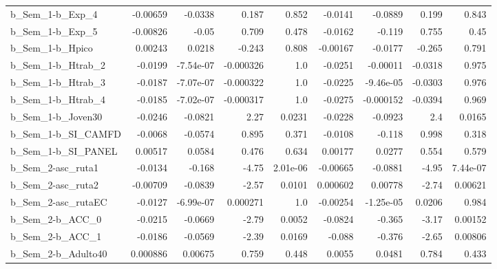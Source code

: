 \begin{tabular}{lrrrrrrrr}
b\_Sem\_1-b\_Exp\_4            &    -0.00659 &      -0.0338 &     0.187 &    0.852 &    -0.0141 &     -0.0889 &        0.199 &         0.843 \\
b\_Sem\_1-b\_Exp\_5            &    -0.00826 &        -0.05 &     0.709 &    0.478 &    -0.0162 &      -0.119 &        0.755 &          0.45 \\
b\_Sem\_1-b\_Hpico            &     0.00243 &       0.0218 &    -0.243 &    0.808 &   -0.00167 &     -0.0177 &       -0.265 &         0.791 \\
b\_Sem\_1-b\_Htrab\_2          &     -0.0199 &    -7.54e-07 & -0.000326 &      1.0 &    -0.0251 &    -0.00011 &      -0.0318 &         0.975 \\
b\_Sem\_1-b\_Htrab\_3          &     -0.0187 &    -7.07e-07 & -0.000322 &      1.0 &    -0.0225 &   -9.46e-05 &      -0.0303 &         0.976 \\
b\_Sem\_1-b\_Htrab\_4          &     -0.0185 &    -7.02e-07 & -0.000317 &      1.0 &    -0.0275 &   -0.000152 &      -0.0394 &         0.969 \\
b\_Sem\_1-b\_Joven30          &     -0.0246 &      -0.0821 &      2.27 &   0.0231 &    -0.0228 &     -0.0923 &          2.4 &        0.0165 \\
b\_Sem\_1-b\_SI\_CAMFD         &     -0.0068 &      -0.0574 &     0.895 &    0.371 &    -0.0108 &      -0.118 &        0.998 &         0.318 \\
b\_Sem\_1-b\_SI\_PANEL         &     0.00517 &       0.0584 &     0.476 &    0.634 &    0.00177 &      0.0277 &        0.554 &         0.579 \\
b\_Sem\_2-asc\_ruta1          &     -0.0134 &       -0.168 &     -4.75 & 2.01e-06 &   -0.00665 &     -0.0881 &        -4.95 &      7.44e-07 \\
b\_Sem\_2-asc\_ruta2          &    -0.00709 &      -0.0839 &     -2.57 &   0.0101 &   0.000602 &     0.00778 &        -2.74 &       0.00621 \\
b\_Sem\_2-asc\_rutaEC         &     -0.0127 &    -6.99e-07 &  0.000271 &      1.0 &   -0.00254 &   -1.25e-05 &       0.0206 &         0.984 \\
b\_Sem\_2-b\_ACC\_0            &     -0.0215 &      -0.0669 &     -2.79 &   0.0052 &    -0.0824 &      -0.365 &        -3.17 &       0.00152 \\
b\_Sem\_2-b\_ACC\_1            &     -0.0186 &      -0.0569 &     -2.39 &   0.0169 &     -0.088 &      -0.376 &        -2.65 &       0.00806 \\
b\_Sem\_2-b\_Adulto40         &    0.000886 &      0.00675 &     0.759 &    0.448 &     0.0055 &      0.0481 &        0.784 &         0.433 \\

\end{tabular}
